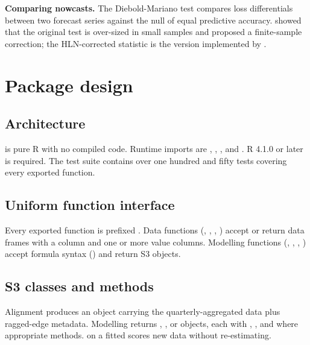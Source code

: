 \textbf{Comparing nowcasts.} The Diebold-Mariano test
\citep{diebold1995comparing} compares loss differentials between two
forecast series against the null of equal predictive accuracy.
\citet{harvey1997testing} showed that the original test is over-sized in
small samples and proposed a finite-sample correction; the
HLN-corrected statistic is the version implemented by
.

\section{Package design}\label{package-design}

\subsection{Architecture}\label{architecture}

 is pure R with no compiled code. Runtime imports
are , , , and
. R 4.1.0 or later is required. The test suite
contains over one hundred and fifty tests covering every exported
function.

\subsection{Uniform function interface}\label{uniform-function-interface}

Every exported function is prefixed . Data functions
(, , ,
) accept or return data frames with a
 column and one or more value columns. Modelling
functions (, ,
, ) accept formula syntax
() and return S3 objects.

\subsection{S3 classes and methods}\label{s3-classes-and-methods}

Alignment produces an  object carrying the
quarterly-aggregated data plus ragged-edge metadata. Modelling
returns , , or
 objects, each with ,
, and where appropriate  methods.
 on a fitted  scores new data
without re-estimating.


